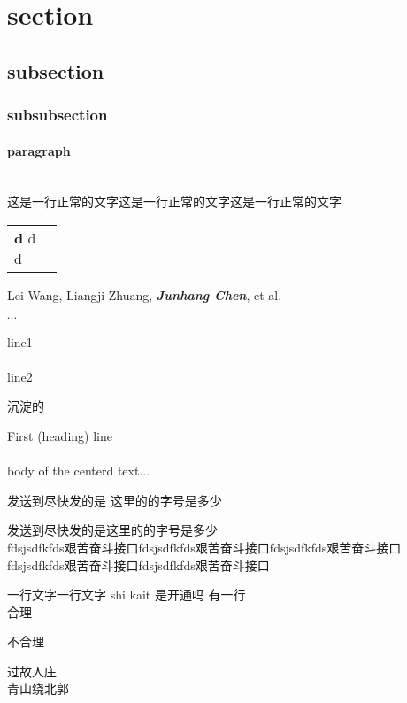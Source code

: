 \documentclass[12pt]{article}
\makeatletter
\newenvironment{twenty}{%
	\begin{tabular*}{\textwidth}{@{\extracolsep{\fill}}ll}
}{%
	\end{tabular*}
}
\newcommand{\twentyitem}[4]{%
	\parbox[t]{0.83\textwidth}{%
		\textbf{#2}%
		\hfill%
		{\footnotesize#3}\\%
		#4\vspace{\parsep}%
	}\\
}
\makeatother
\begin{document}
\tableofcontents

\section{section}
\subsection{subsection}
\subsubsection{subsubsection}
\paragraph{paragraph}

\leavevmode\\

这是一行正常的文字这是一行正常的文字这是一行正常的文字\\
\begin{twenty}
  \twentyitem
  {yu}{d}{d}{d}
  \twentyitem
  {}{a}{a}{a}
\end{twenty}

{Lei Wang, Liangji Zhuang, \textit{\textbf{Junhang Chen}}, et al.\\}

$\cdots$


{
  line1\\
  \\
  line2
}

{\tiny 沉淀的}
\begin{huge}
  

\begin{flushleft}
  First (heading) line\\[\baselineskip]
  \leavevmode\\
  body of the centerd text...
\end{flushleft}
\end{huge}

{\fontsize{40}{48} \selectfont 发送到尽快发的是}
这里的的字号是多少

{\fontsize{12}{200} \selectfont 
发送到尽快发的是这里的的字号是多少\\
fdsjsdfkfds艰苦奋斗接口fdsjsdfkfds艰苦奋斗接口fdsjsdfkfds艰苦奋斗接口\\
fdsjsdfkfds艰苦奋斗接口fdsjsdfkfds艰苦奋斗接口
}


一行文字一行文字
shi kait 是开通吗
\bigskip
有一行\\

合理

不合理

      过故人庄\\

青山绕北郭
\end{document}

